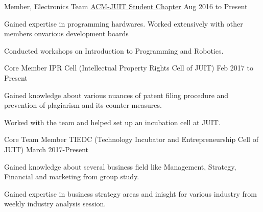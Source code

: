 \begin{cventries}
  \cventry
    {Member, Electronics Team}
    {\href{http://juit.acm.org}{ACM-JUIT Student Chapter}}
    {}
    {Aug 2016 to Present}
    {
      \begin{cvitems}
        \item {Gained expertise in programming hardwares. Worked extensively with other members onvarious development boards}
        \item {Conducted workshops on Introduction to Programming and Robotics.}
      \end{cvitems}
    }
 \cventry
    {Core Member}
    {IPR Cell (Intellectual Property Rights Cell of JUIT)}
    {}
    {Feb 2017 to Present}
    {
      \begin{cvitems}
        \item {Gained knowledge about various nuances of patent filing procedure and prevention of plagiarism and its counter measures.}
        \item {Worked with the team and helped set up an incubation cell at JUIT.}
      \end{cvitems}
    }    
  \cventry
    {Core Team Member}
    {TIEDC (Technology Incubator and Entrepreneurship Cell of JUIT)}
    {}
    {March 2017-Present}
    {
      \begin{cvitems}
        \item {Gained knowledge about several business field like Management, Strategy, Financial and marketing from group study.}
        \item {Gained expertise in business strategy areas and inisght for various industry from weekly industry analysis session.}
      \end{cvitems}
    }
\end{cventries}
